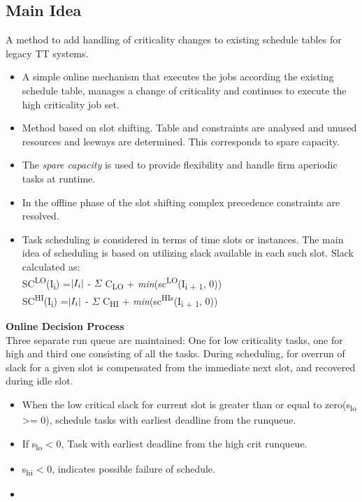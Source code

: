\subsection*{Main Idea}
A method to add handling of criticality changes to existing schedule tables for legacy TT systems.
\begin{itemize}
	\item A simple online mechanism that executes the jobs according the existing schedule table, manages a change of criticality and continues to execute the high criticality job set.
	\item Method based on slot shifting. Table and constraints are analysed and unused resources and leeways are determined. This corresponds to spare capacity.
	\item The \textit{spare capacity} is used to provide flexibility and handle firm aperiodic tasks at runtime.
	\item In the offline phase of the slot shifting complex precedence constraints are resolved.
	\item Task scheduling is considered in terms of time slots or instances. The main idea of scheduling is based on utilizing slack available in each such slot.
	Slack calculated as:\\
		SC\textsuperscript{LO}(I\textsubscript{i}) =$\arrowvert I_i \arrowvert$ - $\Sigma$ C\textsubscript{LO} + \textit{min}(sc\textsuperscript{LO}(I\textsubscript{i + 1}, 0)) \\
		SC\textsuperscript{HI}(I\textsubscript{i}) =$\arrowvert I_i \arrowvert$ - $\Sigma$ C\textsubscript{HI} + \textit{min}(sc\textsuperscript{HIs}(I\textsubscript{i + 1}, 0))
\end{itemize}
\textbf{Online Decision Process}\\
Three separate run queue are maintained: One for low criticality tasks, one for high and third one consisting of all the tasks.
During scheduling, for overrun of slack for a given slot is compensated from the immediate next slot, and recovered during idle slot.
\begin{itemize}
	\item When the low critical slack for current slot is greater than or equal to zero(s\textsubscript{lo} >= 0), schedule tasks with earliest deadline from the runqueue.
	\item If s\textsubscript{lo} < 0, Task with earliest deadline from the high crit runqueue.
	\item s\textsubscript{hi} < 0, indicates possible failure of schedule.
	\item 
\end{itemize}
